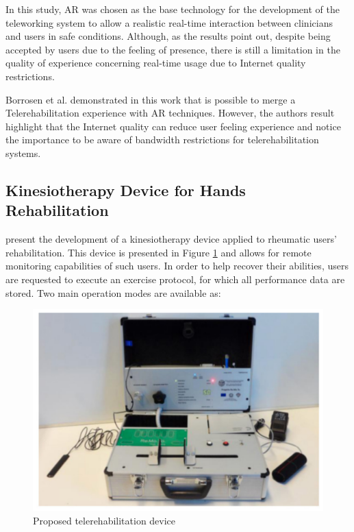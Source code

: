 In this study, AR was chosen as the base technology for the development of the teleworking system to allow a realistic real-time interaction between clinicians and users in safe conditions. Although, as the results point out, despite being accepted by users due to the feeling of presence, there is still a limitation in the quality of experience concerning real-time usage due to Internet quality restrictions.

Borrosen et al. \cite{borresen2019} demonstrated in this work that is possible to merge a Telerehabilitation experience with AR techniques. However, the authors result highlight that the Internet quality can reduce user feeling experience and notice the importance to be aware of bandwidth restrictions for telerehabilitation systems.



\subsection{Kinesiotherapy Device for Hands Rehabilitation}
\label{subsec:pani2014}

\cite{pani2014} present the development of a kinesiotherapy device applied to rheumatic users' rehabilitation. This device is presented in Figure \ref{fig:pani2014-device} and allows for remote monitoring capabilities of such users. In order to help recover their abilities, users are requested to execute an exercise protocol, for which all performance data are stored. Two main operation modes are available as:

\begin{figure}[!hbt]
\begin{center}
\includegraphics[width=0.7 \textwidth]{img/cap3/pani2014-device}
\caption{Proposed telerehabilitation device \cite{pani2014}}
\label{fig:pani2014-device}
\end{center}
\end{figure}

